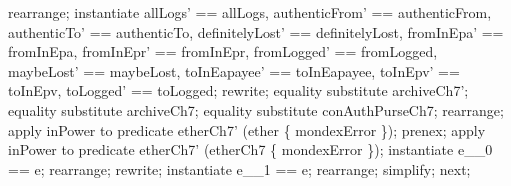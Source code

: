 \begin{LPScript}
\begin{zproof}[tBetwConcCAbortCorrect]
        rearrange;
        instantiate allLogs' == allLogs, authenticFrom' == authenticFrom,
            authenticTo' == authenticTo, definitelyLost' == definitelyLost,
            fromInEpa' == fromInEpa, fromInEpr' == fromInEpr, fromLogged' == fromLogged,
            maybeLost' == maybeLost, toInEapayee' == toInEapayee, toInEpv' == toInEpv,
            toLogged' == toLogged;
        rewrite;
        equality substitute archiveCh7';
        equality substitute archiveCh7;
        equality substitute conAuthPurseCh7;
        rearrange;
        apply inPower to predicate etherCh7' \in \power (ether \cup \{ mondexError \});
        prenex;
        apply inPower to predicate etherCh7' \in \power (etherCh7 \cup \{ mondexError \});
        instantiate e\_\_0 == e;
        rearrange;
        rewrite;
        instantiate e\_\_1 == e;
        rearrange;
        simplify;
    next;
\end{zproof}\end{LPScript}

